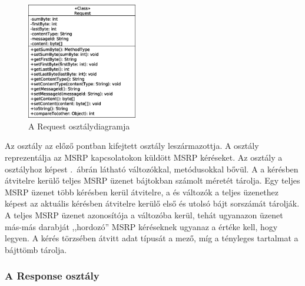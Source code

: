 \begin{figure}
  \vspace{-15pt}
  \begin{center}
    \includegraphics[width=0.43\textwidth]{img/class_diagrams/Request.eps}
  \end{center}
  \vspace{-15pt}
  \captionsetup{font=scriptsize}
  \caption{A Request osztálydiagramja}
   \label{fig:class_request}
  \vspace{-10pt}
\end{figure}
Az osztály az előző pontban kifejtett  osztály leszármazottja. A  osztály reprezentálja az MSRP kapcsolatokon küldött MSRP kéréseket. Az osztály a  osztályhoz képest .~ábrán látható változókkal, metódusokkal bővül. A  a kérésben átvitelre kerülő teljes MSRP üzenet bájtokban számolt méretét tárolja. Egy teljes MSRP üzenet több kérésben kerül átvitelre, a  és  változók a teljes üzenethez képest az aktuális kérésben átvitelre kerülő első és utolsó bájt sorszámát tárolják. A teljes MSRP üzenet azonosítója a  változóba kerül, tehát ugyanazon üzenet más-más darabját ,,hordozó'' MSRP kéréseknek ugyanaz a  értéke kell, hogy legyen. A kérés törzsében átvitt adat típusát a  mező, míg a tényleges tartalmat a  bájttömb tárolja. 

\subsubsection*{A Response osztály}
\label{sec:msrp_response}

